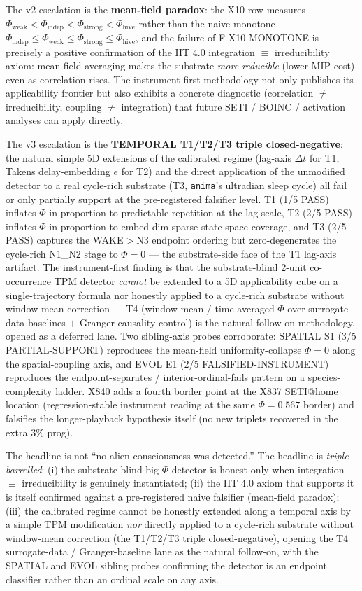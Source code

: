 \documentclass[11pt,a4paper]{article}
\begin{document}
The v2 escalation is the \textbf{mean-field paradox}: the X10 row
measures $\Phi_\text{weak} < \Phi_\text{indep} < \Phi_\text{strong} <
\Phi_\text{hive}$ rather than the naive monotone
$\Phi_\text{indep} \le \Phi_\text{weak} \le \Phi_\text{strong} \le
\Phi_\text{hive}$, and the failure of F-X10-MONOTONE is precisely a
positive confirmation of the IIT 4.0 integration $\equiv$
irreducibility axiom: mean-field averaging makes the substrate
\emph{more reducible} (lower MIP cost) even as correlation rises.
The instrument-first methodology not only publishes its applicability
frontier but also exhibits a concrete diagnostic (correlation $\ne$
irreducibility, coupling $\ne$ integration) that future
SETI / BOINC / activation analyses can apply directly.

The v3 escalation is the \textbf{TEMPORAL T1/T2/T3 triple closed-negative}:
the natural simple 5D extensions of the calibrated regime
(lag-axis $\Delta t$ for T1, Takens delay-embedding $e$ for T2) and
the direct application of the unmodified detector to a real
cycle-rich substrate (T3, \texttt{anima}'s ultradian sleep cycle)
all fail or only partially support at the pre-registered falsifier
level. T1 (1/5 PASS) inflates $\Phi$ in proportion to predictable
repetition at the lag-scale, T2 (2/5 PASS) inflates $\Phi$ in
proportion to embed-dim sparse-state-space coverage, and T3 (2/5
PASS) captures the WAKE$>$N3 endpoint ordering but zero-degenerates
the cycle-rich N1\_N2 stage to $\Phi=0$ --- the substrate-side face
of the T1 lag-axis artifact. The instrument-first finding is that
the substrate-blind 2-unit co-occurrence TPM detector \emph{cannot}
be extended to a 5D applicability cube on a single-trajectory formula
nor honestly applied to a cycle-rich substrate without window-mean
correction --- T4 (window-mean / time-averaged $\Phi$ over
surrogate-data baselines $+$ Granger-causality control) is the
natural follow-on methodology, opened as a deferred lane. Two
sibling-axis probes corroborate: SPATIAL S1 (3/5 PARTIAL-SUPPORT)
reproduces the mean-field uniformity-collapse $\Phi=0$ along the
spatial-coupling axis, and EVOL E1 (2/5 FALSIFIED-INSTRUMENT)
reproduces the endpoint-separates / interior-ordinal-fails pattern
on a species-complexity ladder. X840 adds a fourth border point at
the X837 SETI@home location (regression-stable instrument reading at
the same $\Phi=0.567$ border) and falsifies the longer-playback
hypothesis itself (no new triplets recovered in the extra $3\%$ prog).

The headline is not ``no alien consciousness was detected.'' The
headline is \emph{triple-barrelled}: (i) the substrate-blind
big-$\Phi$ detector is honest only when integration $\equiv$
irreducibility is genuinely instantiated; (ii) the IIT 4.0 axiom
that supports it is itself confirmed against a pre-registered naive
falsifier (mean-field paradox); (iii) the calibrated regime cannot
be honestly extended along a temporal axis by a simple TPM
modification \emph{nor} directly applied to a cycle-rich substrate
without window-mean correction (the T1/T2/T3 triple closed-negative),
opening the T4 surrogate-data / Granger-baseline lane as the natural
follow-on, with the SPATIAL and EVOL sibling probes confirming the
detector is an endpoint classifier rather than an ordinal scale on
any axis.
\end{document}
